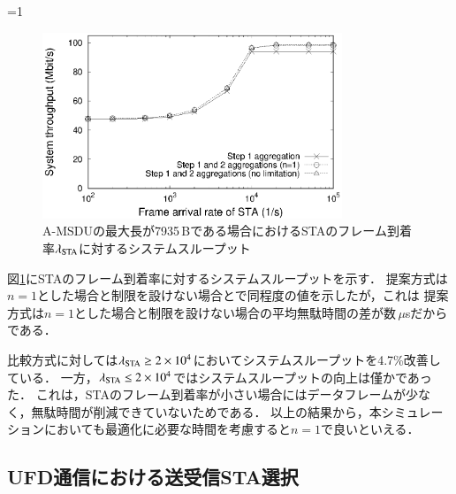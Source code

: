 \documentclass[master]{kuisthesis}		%
\newcounter{flagFig}
\begin{document}
			\par
			\ifnum\value{flagFig}=1 {\begin{figure}[htbp]
				\begin{center}
					\includegraphics[width=0.8\textwidth]{graph/thr_lmd.eps}
					\caption{A-MSDUの最大長が7935\,Bである場合におけるSTAのフレーム到着率$\lambda_{\rm STA}$に対するシステムスループット}
					\label{fig:thr_lmd}
				\end{center}
			\end{figure}}\fi
			図\ref{fig:thr_lmd}にSTAのフレーム到着率に対するシステムスループットを示す．
			提案方式は$n=1$とした場合と制限を設けない場合とで同程度の値を示したが，これは
			提案方式は$n=1$とした場合と制限を設けない場合の平均無駄時間の差が数$\,\mu$sだからである．

			比較方式に対しては$\lambda_{\rm STA} \geq 2 \times 10^{4}$においてシステムスループットを4.7\%改善している．
			一方，$\lambda_{\rm STA} \leq 2 \times 10^{4}$ではシステムスループットの向上は僅かであった．
			これは，STAのフレーム到着率が小さい場合にはデータフレームが少なく，無駄時間が削減できていないためである．
			以上の結果から，本シミュレーションにおいても最適化に必要な時間を考慮すると$n=1$で良いといえる．

	\subsection{UFD通信における送受信STA選択}
\end{document}
